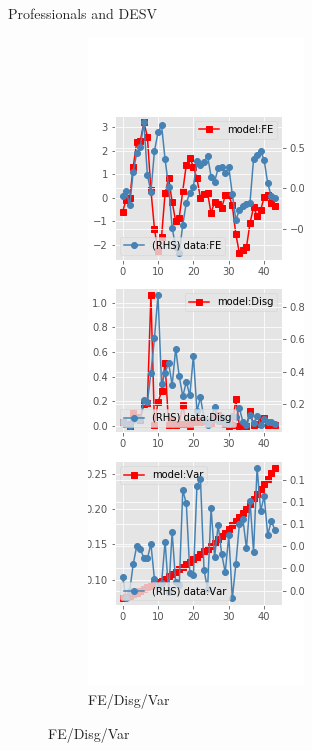 \documentclass{beamer}
\begin{document}
\begin{frame}{Professionals and DESV}
\begin{figure}[ht]
\begin{subfigure}[b]{0.2\textwidth}
		\end{subfigure}
		\hfill
		\begin{subfigure}[b]{0.2\textwidth}
			\caption{FE/Disg/Var}
			\includegraphics[width=\textwidth, height = 0.8\textheight]{figuresDraft/spf_de_est_sv_diag2.png}
		\end{subfigure}
	\end{figure}
\end{frame}
\end{document}
